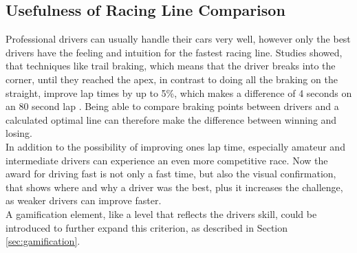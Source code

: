 \subsection{Usefulness of Racing Line Comparison}
Professional drivers can usually handle their cars very well, however only the best drivers have the feeling and intuition for the fastest racing line. Studies showed, that techniques like trail braking, which means that the driver breaks into the corner, until they reached the apex, in contrast to doing all the braking on the straight, improve lap times by up to 5\%, which makes a difference of 4 seconds on an 80 second lap \cite{gustafsson08}. Being able to compare braking points between drivers and a calculated optimal line can therefore make the difference between winning and losing.\\
In addition to the possibility of improving ones lap time, especially amateur and intermediate drivers can experience an even more competitive race. Now the award for driving fast is not only a fast time, but also the visual confirmation, that shows where and why a driver was the best, plus it increases the challenge, as weaker drivers can improve faster.\\
A gamification element, like a level that reflects the drivers skill, could be introduced to further expand this criterion, as described in Section \ref{sec:gamification}.

\clearpage
